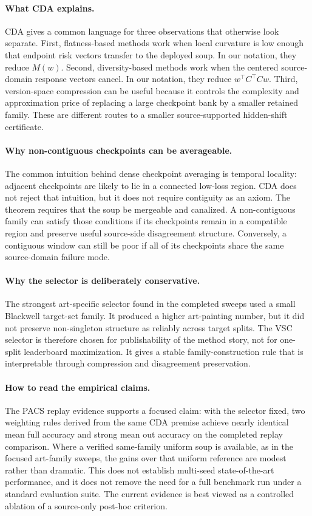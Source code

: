 \documentclass{article}
\theoremstyle{definition}
\begin{document}
\paragraph{What CDA explains.}
CDA gives a common language for three observations that otherwise look separate. First, flatness-based methods work when local curvature is low enough that endpoint risk vectors transfer to the deployed soup. In our notation, they reduce \(M(w)\). Second, diversity-based methods work when the centered source-domain response vectors cancel. In our notation, they reduce \(w^\top C^\top Cw\). Third, version-space compression can be useful because it controls the complexity and approximation price of replacing a large checkpoint bank by a smaller retained family. These are different routes to a smaller source-supported hidden-shift certificate.

\paragraph{Why non-contiguous checkpoints can be averageable.}
The common intuition behind dense checkpoint averaging is temporal locality: adjacent checkpoints are likely to lie in a connected low-loss region. CDA does not reject that intuition, but it does not require contiguity as an axiom. The theorem requires that the soup be mergeable and canalized. A non-contiguous family can satisfy those conditions if its checkpoints remain in a compatible region and preserve useful source-side disagreement structure. Conversely, a contiguous window can still be poor if all of its checkpoints share the same source-domain failure mode.

\paragraph{Why the selector is deliberately conservative.}
The strongest art-specific selector found in the completed sweeps used a small Blackwell target-set family. It produced a higher art-painting number, but it did not preserve non-singleton structure as reliably across target splits. The VSC selector is therefore chosen for publishability of the method story, not for one-split leaderboard maximization. It gives a stable family-construction rule that is interpretable through compression and disagreement preservation.

\paragraph{How to read the empirical claims.}
The PACS replay evidence supports a focused claim: with the selector fixed, two weighting rules derived from the same CDA premise achieve nearly identical mean full accuracy and strong mean out accuracy on the completed replay comparison. Where a verified same-family uniform soup is available, as in the focused art-family sweeps, the gains over that uniform reference are modest rather than dramatic. This does not establish multi-seed state-of-the-art performance, and it does not remove the need for a full benchmark run under a standard evaluation suite. The current evidence is best viewed as a controlled ablation of a source-only post-hoc criterion.
\end{document}
